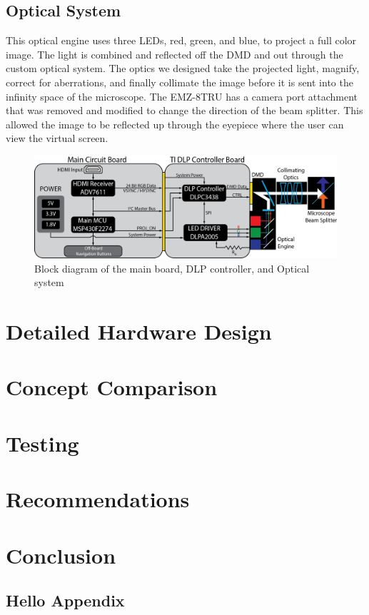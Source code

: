 \documentclass[12pt,a4paper]{article}
\begin{document}
\subsection{Optical System}
This optical engine uses three LEDs, red, green, and blue, to project a full color image. The light is combined and reflected off the DMD and out through the custom optical system. The optics we designed take the projected light, magnify, correct for aberrations, and finally collimate the image before it is sent into the infinity space of the microscope. The EMZ-8TRU has a camera port attachment that was removed and modified to change the direction of the beam splitter. This allowed the image to be reflected up through the eyepiece where the user can view the virtual screen.

\begin{figure}
	\centering
	\includegraphics[width = \textwidth]{pics/seniorDesign_blockDiagram.png}
	\caption[Block Diagram]{Block diagram of the main board, DLP controller, and Optical system}
	\label{block_diagram}
\end{figure}




\section{Detailed Hardware Design}




\section{Concept Comparison}



\section{Testing}




\section{Recommendations}





\section{Conclusion}






\begin{appendices}

\section{Hello Appendix}

\end{appendices}
\end{document}
